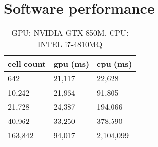\chapter{Software performance}

\begin{table}[ht]
	\centering
	\begin{tabular}{lll} \hline
	cell count & gpu (ms)    & cpu (ms)\\ \hline
	642      & 21,117 & 22,628    \\
	10,242   & 21,964 & 91,805    \\
	21,728   & 24,387 & 194,066   \\
	40,962   & 33,250 & 378,590   \\
	163,842  & 94,017 & 2,104,099 \\ \hline 
	\end{tabular}
	\caption{GPU: NVIDIA GTX 850M, CPU: INTEL i7-4810MQ}
	\label{tab:perf}
\end{table}


